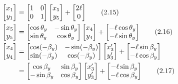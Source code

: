     \begin{align}
    \begin{bmatrix}
    x_1 \\
    y_1
    \end{bmatrix}
    &=
    \begin{bmatrix}
    1 & 0 \\
    0 & 1
    \end{bmatrix}
    \begin{bmatrix}
    x_5 \\
    y_5
    \end{bmatrix}
    +
    \begin{bmatrix}
    2\ell \\
    0
    \end{bmatrix}
    \tag{2.15} \\
    \begin{bmatrix}
    x_5 \\
    y_5
    \end{bmatrix}
    &=
    \begin{bmatrix}
    \cos\theta_y & -\sin\theta_y \\
    \sin\theta_y & \cos\theta_y
    \end{bmatrix}
    \begin{bmatrix}
    x_4 \\
    y_4
    \end{bmatrix}
    +
    \begin{bmatrix}
    -\ell \cos\theta_y \\
    -\ell \sin\theta_y
    \end{bmatrix}
    \tag{2.16} \\
    \begin{bmatrix}
    x_4 \\
    y_4
    \end{bmatrix}
    &=
    \begin{bmatrix}
    \cos(-\beta_y) & -\sin(-\beta_y) \\
    \sin(-\beta_y) & \cos(-\beta_y)
    \end{bmatrix}
    \begin{bmatrix}
    x_3' \\
    y_3'
    \end{bmatrix}
    +
    \begin{bmatrix}
    -\ell \sin\beta_y \\
    -\ell \cos\beta_y
    \end{bmatrix} \notag \\
    &=
    \begin{bmatrix}
    \cos\beta_y & \sin\beta_y \\
    -\sin\beta_y & \cos\beta_y
    \end{bmatrix}
    \begin{bmatrix}
    x_3' \\
    y_3'
    \end{bmatrix}
    +
    \begin{bmatrix}
    -\ell \sin\beta_y \\
    -\ell \cos\beta_y
    \end{bmatrix}
    \tag{2.17}
    \end{align}
    
